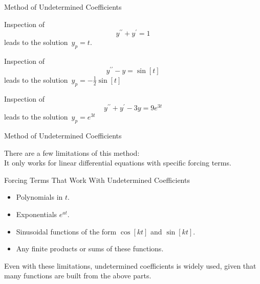 \documentclass{beamer}
\begin{document}
\begin{frame}{Method of Undetermined Coefficients}
\begin{example}
Inspection of
\begin{equation*}
y^{\prime\prime}+y^{\prime}=1
\end{equation*}
leads to the solution\pause\ $y_p=t$.
\end{example}\pause

\begin{example}
Inspection of
\begin{equation*}
y^{\prime\prime}-y=\sin[t]
\end{equation*}
leads to the solution\pause\  $y_p=-\tfrac{1}{2}\sin[t]$
\end{example}\pause

\begin{example}
Inspection of
\begin{equation*}
y^{\prime\prime}+y^{\prime}-3y=9e^{3t}
\end{equation*}
leads to the solution\pause\  $y_p=e^{3t}$
\end{example}
\end{frame}

\begin{frame}{Method of Undetermined Coefficients}
\begin{block}{}
There are a few limitations of this method:\\ It only works for linear differential equations with specific forcing terms.
\end{block}\pause

\begin{block}{Forcing Terms That Work With Undetermined Coefficients}
\begin{itemize}
\item Polynomials in $t$.
\item Exponentials $e^{at}$.
\item Sinusoidal functions of the form $\cos[kt]$ and $\sin[kt]$.
\item Any finite products or sums of these functions.
\end{itemize}
\end{block}\pause
\begin{block}{}
Even with these limitations, undetermined coefficients is widely used, given that many functions are built from the above parts.
\end{block}
\end{frame}
\end{document}
